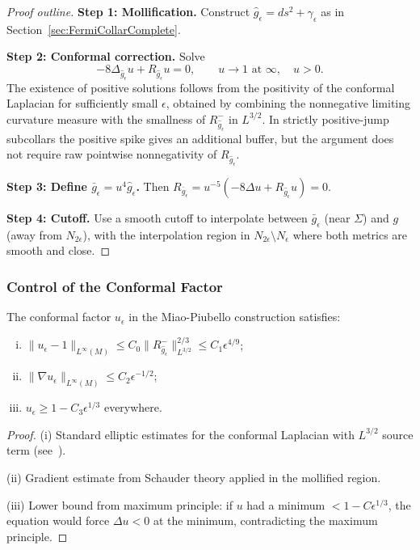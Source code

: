 \begin{proof}[Proof outline]
\textbf{Step 1: Mollification.} Construct $\hat{g}_\epsilon = ds^2 + \gamma_\epsilon$ as in Section~\ref{sec:FermiCollarComplete}.

\textbf{Step 2: Conformal correction.} Solve
\[
-8\Delta_{\hat{g}_\epsilon} u + R_{\hat{g}_\epsilon} u = 0, \qquad u \to 1 \text{ at } \infty, \quad u > 0.
\]
The existence of positive solutions follows from the positivity of the conformal Laplacian for sufficiently small $\epsilon$, obtained by combining the nonnegative limiting curvature measure with the smallness of $R^-_{\hat{g}_\epsilon}$ in $L^{3/2}$. In strictly positive-jump subcollars the positive spike gives an additional buffer, but the argument does not require raw pointwise nonnegativity of $R_{\hat g_\epsilon}$.

\textbf{Step 3: Define $\bar{g}_\epsilon = u^4 \hat{g}_\epsilon$.} Then $R_{\bar{g}_\epsilon} = u^{-5}(-8\Delta u + R_{\hat{g}_\epsilon} u) = 0$.

\textbf{Step 4: Cutoff.} Use a smooth cutoff to interpolate between $\bar{g}_\epsilon$ (near $\Sigma$) and $g$ (away from $N_{2\epsilon}$), with the interpolation region in $N_{2\epsilon} \setminus N_\epsilon$ where both metrics are smooth and close.
\end{proof}

\subsubsection{Control of the Conformal Factor}

\begin{lemma}
\label{lem:ConformalFactorBounds}
The conformal factor $u_\epsilon$ in the Miao-Piubello construction satisfies:
\begin{enumerate}[(i)]
\item $\|u_\epsilon - 1\|_{L^\infty(M)} \le C_0 \|R^-_{\hat{g}_\epsilon}\|_{L^{3/2}}^{2/3} \le C_1 \epsilon^{4/9}$;
\item $\|\nabla u_\epsilon\|_{L^\infty(M)} \le C_2 \epsilon^{-1/2}$;
\item $u_\epsilon \ge 1 - C_3 \epsilon^{1/3}$ everywhere.
\end{enumerate}
\end{lemma}

\begin{proof}
(i) Standard elliptic estimates for the conformal Laplacian with $L^{3/2}$ source term (see~\cite[Thm.~8.16]{gilbarg2001}).

(ii) Gradient estimate from Schauder theory applied in the mollified region.

(iii) Lower bound from maximum principle: if $u$ had a minimum $< 1 - C\epsilon^{1/3}$, the equation would force $\Delta u < 0$ at the minimum, contradicting the maximum principle.
\end{proof}

